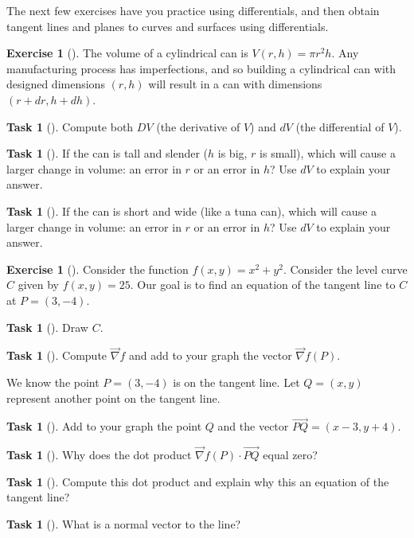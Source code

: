 \documentclass[10pt,]{book}
\theoremstyle{plain}
\theoremstyle{definition}
\theoremstyle{definition}
\theoremstyle{definition}
\theoremstyle{definition}
\newtheorem{exploration}[project]{Exercise}
\newtheorem{task}[project]{Task}
\theoremstyle{definition}
\numberwithin{equation}{section}
\begin{document}
The next few exercises have you practice using differentials, and then obtain tangent lines and planes to curves and surfaces using differentials.%
\begin{exploration}[]\label{exploration-231}
The volume of a cylindrical can is \(V(r,h)=\pi r^2 h\). Any manufacturing process has imperfections, and so building a cylindrical can with designed dimensions \((r,h)\) will result in a can with dimensions \((r+dr,h+dh)\).%
\begin{task}[]\label{task-616}
Compute both \(DV\) (the derivative of \(V\)) and \(dV\) (the differential of \(V\)).%
\end{task}
\begin{task}[]\label{task-617}
If the can is tall and slender (\(h\) is big, \(r\) is small), which will cause a larger change in volume: an error in \(r\) or an error in \(h\)? Use \(dV\) to explain your answer.%
\end{task}
\begin{task}[]\label{task-618}
If the can is short and wide (like a tuna can), which will cause a larger change in volume: an error in \(r\) or an error in \(h\)? Use \(dV\) to explain your answer.%
\end{task}
\end{exploration}
\begin{exploration}[]\label{exploration-232}
Consider the function \(f(x,y)=x^2+y^2\). Consider the level curve \(C\) given by \(f(x,y)=25\). Our goal is to find an equation of the tangent line to \(C\) at \(P=(3,-4)\).%
\begin{task}[]\label{task-619}
Draw \(C\).%
\end{task}
\begin{task}[]\label{task-620}
Compute \(\vec \nabla f\) and add to your graph the vector \(\vec \nabla f(P)\).%
\end{task}
We know the point \(P=(3,-4)\) is on the tangent line. Let \(Q=(x,y)\) represent another point on the tangent line.%
\begin{task}[]\label{task-621}
Add to your graph the point \(Q\) and the vector \(\vec {PQ} = (x-3,y+4)\).%
\end{task}
\begin{task}[]\label{task-622}
Why does the dot product \(\vec \nabla f(P)\cdot\vec{PQ}\) equal zero?%
\end{task}
\begin{task}[]\label{task-623}
Compute this dot product and explain why this an equation of the tangent line?%
\end{task}
\begin{task}[]\label{task-624}
What is a normal vector to the line?%
\end{task}
\end{exploration}
\end{document}
